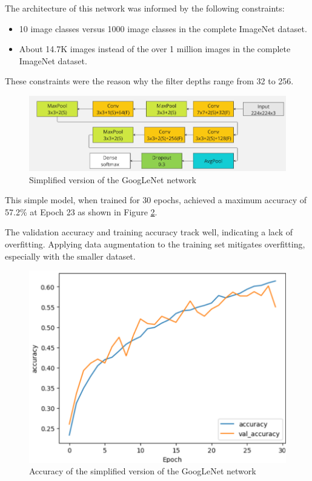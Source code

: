 \documentclass{article}
\begin{document}
The architecture of this network was informed by the following constraints:
\begin{itemize}
    \item 10 image classes versus 1000 image classes in the complete ImageNet dataset.
    \item About 14.7K images instead of the over 1 million images in the complete ImageNet dataset.
\end{itemize}

These constraints were the reason why the filter depths range from 32 to 256.


\begin{figure}[ht]
    \centering
    \includegraphics[scale=0.7]{project/paper_images/googlenet_simple.png}
    \caption{Simplified version of the GoogLeNet network}
    \label{fig:cnn-simple}
\end{figure}

This simple model, when trained for 30 epochs, achieved a maximum accuracy of 57.2\% at Epoch 23 as shown in Figure \ref{fig:googlenet-simple-accuracy}.

The validation accuracy and training accuracy track well, indicating a lack of overfitting. Applying data augmentation to the training set mitigates overfitting, especially with the smaller dataset.
\begin{figure}[ht]
    \centering
    \includegraphics[scale=0.7]{project/paper_images/googlenet_simple_accuracy.png}
    \caption{Accuracy of the simplified version of the GoogLeNet network}
    \label{fig:googlenet-simple-accuracy}
\end{figure}
\end{document}
